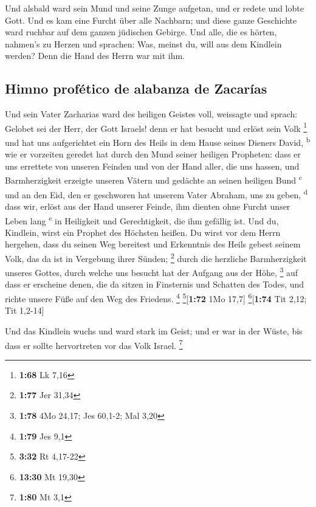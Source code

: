  Und alsbald ward sein Mund und seine Zunge aufgetan, und
er redete und lobte Gott.  Und es kam eine Furcht über
alle Nachbarn; und diese ganze Geschichte ward ruchbar auf dem ganzen
jüdischen Gebirge.  Und alle, die es hörten, nahmen's zu
Herzen und sprachen: Was, meinst du, will aus dem Kindlein werden? Denn
die Hand des Herrn war mit ihm.

\hypertarget{himno-profuxe9tico-de-alabanza-de-zacaruxedas}{%
\subsection{Himno profético de alabanza de
Zacarías}\label{himno-profuxe9tico-de-alabanza-de-zacaruxedas}}

 Und sein Vater Zacharias ward des heiligen Geistes voll,
weissagte und sprach:  Gelobet sei der Herr, der Gott
Israels! denn er hat besucht und erlöst sein Volk \footnote{\textbf{1:68}
  Lk 7,16}  und hat uns aufgerichtet ein Horn des Heils
in dem Hause seines Dieners David, \textsuperscript{b} 
wie er vorzeiten geredet hat durch den Mund seiner heiligen Propheten:
 dass er uns errettete von unseren Feinden und von der
Hand aller, die uns hassen,  und Barmherzigkeit erzeigte
unseren Vätern und gedächte an seinen heiligen Bund \textsuperscript{c}
 und an den Eid, den er geschworen hat unserem Vater
Abraham, uns zu geben, \textsuperscript{d}  dass wir,
erlöst aus der Hand unserer Feinde, ihm dienten ohne Furcht unser Leben
lang \textsuperscript{e}  in Heiligkeit und
Gerechtigkeit, die ihm gefällig ist.  Und du, Kindlein,
wirst ein Prophet des Höchsten heißen. Du wirst vor dem Herrn hergehen,
dass du seinen Weg bereitest  und Erkenntnis des Heils
gebest seinem Volk, das da ist in Vergebung ihrer Sünden; \footnote{\textbf{1:77}
  Jer 31,34}  durch die herzliche Barmherzigkeit unseres
Gottes, durch welche uns besucht hat der Aufgang aus der Höhe,
\footnote{\textbf{1:78} 4Mo 24,17; Jes 60,1-2; Mal 3,20} 
auf dass er erscheine denen, die da sitzen in Finsternis und Schatten
des Todes, und richte unsere Füße auf den Weg des Friedens. \footnote{\textbf{1:79}
  Jes 9,1} \footnote{\textbf{3:32} Rt 4,17-22}{[}\textbf{1:72} 1Mo
17,7{]} \footnote{\textbf{13:30} Mt 19,30}{[}\textbf{1:74} Tit 2,12; Tit
1,2-14{]}

 Und das Kindlein wuchs und ward stark im Geist; und er
war in der Wüste, bis dass er sollte hervortreten vor das Volk Israel.
\footnote{\textbf{1:80} Mt 3,1}

